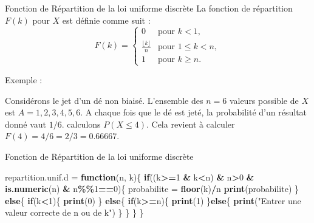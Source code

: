 \documentclass[
  ignorenonframetext,
]{beamer}
\newenvironment{Shaded}{\begin{snugshade}}{\end{snugshade}}
\newcommand{\ControlFlowTok}[1]{\textcolor[rgb]{0.13,0.29,0.53}{\textbf{#1}}}
\newcommand{\DecValTok}[1]{\textcolor[rgb]{0.00,0.00,0.81}{#1}}
\newcommand{\FunctionTok}[1]{\textcolor[rgb]{0.13,0.29,0.53}{\textbf{#1}}}
\newcommand{\NormalTok}[1]{#1}
\newcommand{\OtherTok}[1]{\textcolor[rgb]{0.56,0.35,0.01}{#1}}
\newcommand{\SpecialCharTok}[1]{\textcolor[rgb]{0.81,0.36,0.00}{\textbf{#1}}}
\newcommand{\StringTok}[1]{\textcolor[rgb]{0.31,0.60,0.02}{#1}}
\begin{document}
\begin{frame}{Fonction de Répartition de la loi uniforme discrète}
\protect\hypertarget{fonction-de-ruxe9partition-de-la-loi-uniforme-discruxe8te}{}
La fonction de répartition \(F(k)\) pour \(X\) est définie comme suit :
\[F(k) = 
\begin{cases} 
0 & \text{pour } k < 1, \\
\frac{\lfloor k \rfloor}{n} & \text{pour } 1 \leq k < n, \\
1 & \text{pour } k \geq n.
\end{cases}\]

Exemple :

Considérons le jet d'un dé non biaisé. L'ensemble des \(n = 6\) valeurs
possible de \(X\) est \(A = {1, 2, 3, 4, 5, 6}\). A chaque fois que le
dé est jeté, la probabilité d'un résultat donné vaut \(1/6\). calculons
\(P(X\le 4)\). Cela revient à calculer \(F(4)= 4/6 = 2/3 = 0.66667\).
\end{frame}

\begin{frame}[fragile]{Fonction de Répartition de la loi uniforme
discrète}
\protect\hypertarget{fonction-de-ruxe9partition-de-la-loi-uniforme-discruxe8te-1}{}
\begin{Shaded}
\begin{Highlighting}[]
\NormalTok{repartition.unif.d }\OtherTok{=} \ControlFlowTok{function}\NormalTok{(n, k)\{}
  \ControlFlowTok{if}\NormalTok{((k}\SpecialCharTok{\textgreater{}=}\DecValTok{1} \SpecialCharTok{\&}\NormalTok{ k}\SpecialCharTok{\textless{}}\NormalTok{n) }\SpecialCharTok{\&}\NormalTok{ n}\SpecialCharTok{\textgreater{}}\DecValTok{0} \SpecialCharTok{\&} \FunctionTok{is.numeric}\NormalTok{(n) }\SpecialCharTok{\&}\NormalTok{ n}\SpecialCharTok{\%\%}\DecValTok{1}\SpecialCharTok{==}\DecValTok{0}\NormalTok{)\{}
\NormalTok{    probabilite }\OtherTok{=} \FunctionTok{floor}\NormalTok{(k)}\SpecialCharTok{/}\NormalTok{n}
    \FunctionTok{print}\NormalTok{(probabilite)}
\NormalTok{  \} }\ControlFlowTok{else}\NormalTok{\{}
    \ControlFlowTok{if}\NormalTok{(k}\SpecialCharTok{\textless{}}\DecValTok{1}\NormalTok{)\{}
      \FunctionTok{print}\NormalTok{(}\DecValTok{0}\NormalTok{)}
\NormalTok{    \} }\ControlFlowTok{else}\NormalTok{\{}
      \ControlFlowTok{if}\NormalTok{(k}\SpecialCharTok{\textgreater{}=}\NormalTok{n)\{}
        \FunctionTok{print}\NormalTok{(}\DecValTok{1}\NormalTok{)}
\NormalTok{      \}}\ControlFlowTok{else}\NormalTok{\{}
        \FunctionTok{print}\NormalTok{(}\StringTok{"Entrer une valeur correcte de n ou de k"}\NormalTok{)}
\NormalTok{      \}}
\NormalTok{    \}}
\NormalTok{  \}}
\NormalTok{\}}
\end{Highlighting}
\end{Shaded}
\end{frame}
\end{document}
